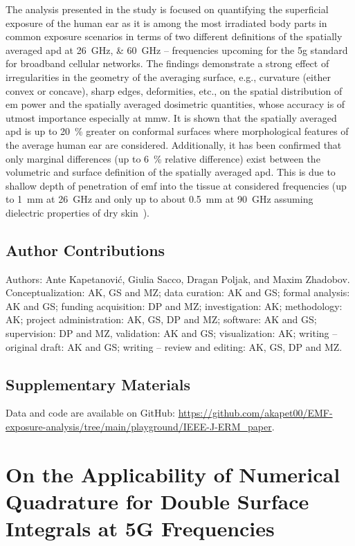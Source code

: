 The analysis presented in the study is focused on quantifying the superficial exposure of the human ear as it is among the most irradiated body parts in common exposure scenarios in terms of two different definitions of the spatially averaged \gls{apd} at \SIlist{26;60}{\GHz} -- frequencies upcoming for the \gls{5g} standard for broadband cellular networks.
The findings demonstrate a strong effect of irregularities in the geometry of the averaging surface, e.g., curvature (either convex or concave), sharp edges, deformities, etc., on the spatial distribution of \gls{em} power and the spatially averaged dosimetric quantities, whose accuracy is of utmost importance especially at \gls{mmw}.
It is shown that the spatially averaged \gls{apd} is up to \SI{20}{\percent} greater on conformal surfaces where morphological features of the average human ear are considered.
Additionally, it has been confirmed that only marginal differences (up to \SI{6}{\percent} relative difference) exist between the volumetric and surface definition of the spatially averaged \gls{apd}.
This is due to shallow depth of penetration of \gls{emf} into the tissue at considered frequencies (up to \SI{1}{\mm} at \SI{26}{\GHz} and only up to about \SI{0.5}{\mm} at \SI{90}{\GHz} assuming dielectric properties of dry skin~\cite{Sasaki2017Monte}).

\subsection{Author Contributions}
Authors: Ante Kapetanović, Giulia Sacco, Dragan Poljak, and Maxim Zhadobov.\\
Conceptualization: AK, GS and MZ; data curation: AK and GS; formal analysis: AK and GS; funding acquisition: DP and MZ; investigation: AK; methodology: AK; project administration: AK, GS, DP and MZ; software: AK and GS; supervision: DP and MZ, validation: AK and GS; visualization: AK; writing -- original draft: AK and GS; writing -- review and editing: AK, GS, DP and MZ.

\subsection{Supplementary Materials}
Data and code are available on GitHub: \url{https://github.com/akapet00/EMF-exposure-analysis/tree/main/playground/IEEE-J-ERM_paper}.


\section{On the Applicability of Numerical Quadrature for Double Surface Integrals at 5G Frequencies}
\label{sec:publication_4}
